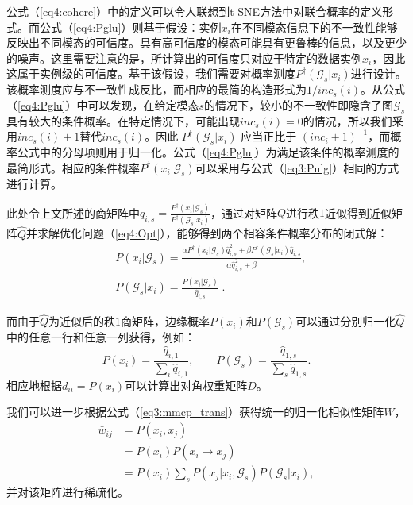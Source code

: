 公式（\ref{eq4:cohere}）中的定义可以令人联想到t-SNE\cite{maaten2008visualizing}方法中对联合概率的定义形式。而公式（\ref{eq4:Pglu}）则基于假设：实例$x_i$在不同模态信息下的不一致性能够反映出不同模态的可信度。具有高可信度的模态可能具有更鲁棒的信息，以及更少的噪声。这里需要注意的是，所计算出的可信度只对应于特定的数据实例$x_i$，因此这属于实例级的可信度。基于该假设，我们需要对概率测度$ P^\dagger(\mathcal{G}_s|x_i) $进行设计。该概率测度应与不一致性成反比，而相应的最简的构造形式为$ 1/inc_s(i) $。从公式（\ref{eq4:Pglu}）中可以发现，在给定模态$s$的情况下，较小的不一致性即隐含了图$\mathcal{G}_s$具有较大的条件概率。在特定情况下，可能出现$ inc_s(i) =0 $的情况，所以我们采用$ inc_s(i) +1 $替代$ inc_s(i)$。因此 $ P^\dagger(\mathcal{G}_s|x_i) $ 应当正比于 $ (inc_i+1)^{-1} $，而概率公式中的分母项则用于归一化。公式（\ref{eq4:Pglu}）为满足该条件的概率测度的最简形式。相应的条件概率$P^\dagger(x_i|\mathcal{G}_s)$可以采用与公式（\ref{eq3:Pulg}）相同的方式进行计算。

此处令上文所述的商矩阵中$q_{i,s} = \frac{P^\dagger(x_i|\mathcal{G}_s)}{P^\dagger(\mathcal{G}_s|x_i)}$，通过对矩阵$Q$进行秩$1$近似得到近似矩阵$\hat{Q}$并求解优化问题（\ref{eq4:Opt}），能够得到两个相容条件概率分布的闭式解：
\begin{equation}
\begin{split}
&P(x_i|\mathcal{G}_s) = \frac{\alpha P^\dagger(x_i|\mathcal{G}_s)\hat{{q}}_{i,s}^2+\beta P^\dagger(\mathcal{G}_s|x_i)\hat{{q}}_{i,s}}{\alpha \hat{{q}}_{i,s}^2 + \beta},\\
&P(\mathcal{G}_s|x_i) = \frac{P(x_i|\mathcal{G}_s)}{\hat{{q}}_{i,s}}\;. 
\end{split}
\label{eq4:OptSlv}
\end{equation}

而由于$\hat{Q}$为近似后的秩$1$商矩阵，边缘概率$P(x_i)$和$P(\mathcal{G}_s)$可以通过分别归一化$\hat{Q}$中的任意一行和任意一列获得，例如：
\begin{equation}
    P(x_i) = \frac{\hat{q}_{i,1}}{\sum_i\hat{q}_{i,1}}, \quad\quad P(\mathcal{G}_s) = \frac{\hat{q}_{1,s}}{\sum_s\hat{q}_{1,s}}.
\end{equation}
相应地根据$\bar{d}_{ii}=P(x_i)$可以计算出对角权重矩阵$\bar{D}$。

我们可以进一步根据公式（\ref{eq3:mmcp_trans}）获得统一的归一化相似性矩阵$\bar{W}$，
\begin{equation}
\begin{split}
\bar{w}_{ij} &= P(x_i,x_j) \\ &= P(x_i)P(x_i\rightarrow x_j)\\
&=P(x_i)\sum_s P(x_j|x_i, \mathcal{G}_s)P(\mathcal{G}_s|x_i), 
\end{split}
\label{eq4:uni_aff}
\end{equation}
并对该矩阵进行稀疏化。


